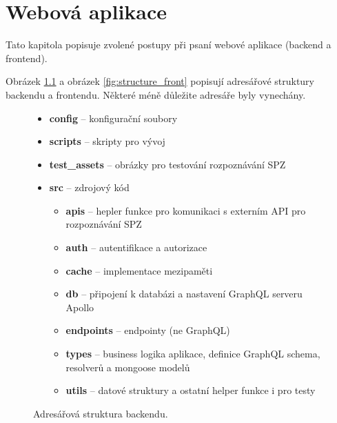 
\chapter{Webová aplikace}

Tato kapitola popisuje zvolené postupy při psaní webové aplikace (backend a frontend).

Obrázek \ref{fig:structure_back} a obrázek \ref{fig:structure_front} popisují adresářové
struktury backendu a frontendu.
Některé méně důležite adresáře byly vynechány.

\begin{figure} [!htb]
  \begin{itemize}
    \setlength\itemsep{.05em}
    \item \textbf{config} -- konfigurační soubory
    \item \textbf{scripts} -- skripty pro vývoj
    \item \textbf{test\_assets} -- obrázky pro testování rozpoznávání SPZ
    \item \textbf{src} -- zdrojový kód
    \begin{itemize}
      \setlength\itemsep{.05em}
      \item \textbf{apis} -- hepler funkce pro komunikaci s externím API pro rozpoznávání SPZ
      \item \textbf{auth} -- autentifikace a autorizace
      \item \textbf{cache} -- implementace mezipaměti
      \item \textbf{db} -- připojení k databázi a nastavení GraphQL serveru Apollo
      \item \textbf{endpoints} -- endpointy (ne GraphQL)
      \item \textbf{types} -- business logika aplikace, definice GraphQL schema, resolverů a mongoose modelů
      \item \textbf{utils} -- datové struktury a ostatní helper funkce i pro testy
    \end{itemize}
  \end{itemize}
  \caption{Adresářová struktura backendu.}
  \label{fig:structure_back}
  \end{figure}
  
